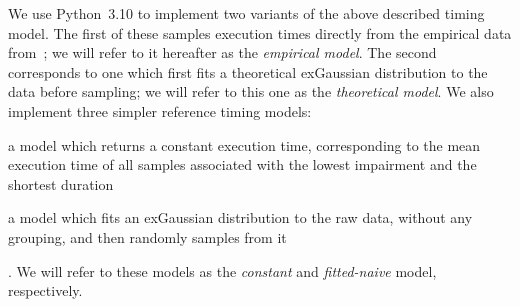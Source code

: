 We use Python~\num{3.10} to implement two variants of the above described timing model.
The first of these samples execution times directly from the empirical data from~\cite{olguinmunoz:impact2021}; we will refer to it hereafter as the \emph{empirical model}.
The second corresponds to one which first fits a theoretical \ac{exGaussian} distribution to the data before sampling; we will refer to this one as the \emph{theoretical model}.
We also implement three simpler reference timing models:
\begin{enumerate*}[itemjoin={{; }}, itemjoin*={{; and }}]
    \item a model which returns a constant execution time, corresponding to the mean execution time of all samples associated with the lowest impairment and the shortest duration
    \item a model which fits an \ac{exGaussian} distribution to the raw data, without any grouping, and then randomly samples from it  
\end{enumerate*}.
We will refer to these models as the \emph{constant} and \emph{fitted-naive} model, respectively.


